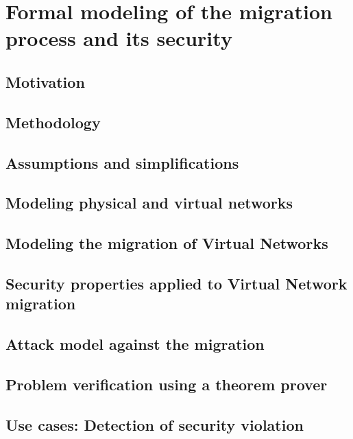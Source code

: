 \documentclass[a4paper, 11pt]{article}
\begin{document}
\newpage
\section{Formal modeling of the migration process and its security}
\subsection{Motivation}


\subsection{Methodology}


\subsection{Assumptions and simplifications}


\subsection{Modeling physical and virtual networks}


\subsection{Modeling the migration of Virtual Networks}


\subsection{Security properties applied to Virtual Network migration}


\subsection{Attack model against the migration}


\subsection{Problem verification using a theorem prover}


\subsection{Use cases: Detection of security violation}

\end{document}
